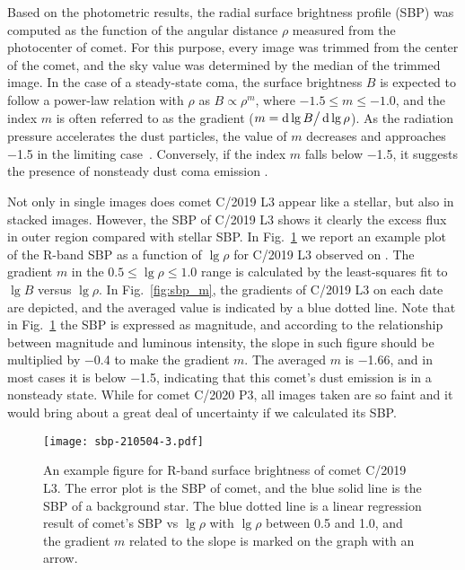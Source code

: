 Based on the photometric results, the radial surface brightness profile (SBP) was computed as the function of the angular distance $\rho$ measured from the photocenter of comet. For this purpose, every image was trimmed from the center of the comet, and the sky value was determined by the median of the trimmed image. 
In the case of a steady-state coma, the surface brightness $B$ is expected to follow a power-law relation with $\rho$ as $B \propto \rho^m$, where $-1.5 \leqslant m \leqslant -1.0$, and the index $m$ is often referred to as the gradient ($m=\mathop{}\!\mathrm{d}\lg{B} \big/ \mathop{}\!\mathrm{d}\lg{\rho}$). As the radiation pressure accelerates the dust particles, the value of $m$ decreases and approaches \si{\num{-1.5}} in the limiting case~\citep{jewitt_surface_1987}. Conversely, if the index $m$ falls below \si{\num{-1.5}}, it suggests the presence of nonsteady dust coma emission \citep{lowry_ccd_1999}.

Not only in single images does comet C/2019 L3 appear like a stellar, but also in stacked images. However, the SBP of C/2019 L3 shows it clearly the excess flux in outer region compared with stellar SBP. In Fig.~\ref{fig:sbp} we report an example plot of the R-band SBP as a function of $\lg{\rho}$ for C/2019 L3 observed on . The gradient $m$ in the $0.5 \leqslant \lg{\rho} \leqslant 1.0$ range is calculated by the least-squares fit to $\lg{B}$ versus $\lg{\rho}$. 
In Fig.~\ref{fig:sbp_m}, the gradients of C/2019 L3 on each date are depicted, and the averaged value is indicated by a blue dotted line. 
Note that in Fig.~\ref{fig:sbp} the SBP is expressed as magnitude, and according to the relationship between magnitude and luminous intensity, the slope in such figure should be multiplied by \num{-0.4} to make the gradient $m$. The averaged $m$ is \num{-1.66}, and in most cases it is below \num{-1.5}, indicating that this comet's dust emission is in a nonsteady state. While for comet C/2020 P3, all images taken are so faint and it would bring about a great deal of uncertainty if we calculated its SBP. 

\begin{figure}
    \centering
    \texttt{[image: sbp-210504-3.pdf]}
    \caption{An example figure for R-band surface brightness of comet C/2019 L3. The error plot is the SBP of comet, and the blue solid line is the SBP of a background star. The blue dotted line is a linear regression result of comet's SBP vs $\lg{\rho}$ with $\lg{\rho}$ between 0.5 and 1.0, and the gradient $m$ related to the slope is marked on the graph with an arrow. }
    \label{fig:sbp}
\end{figure}

